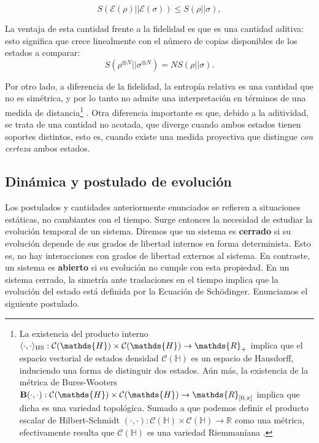 \documentclass{report} %
\newcommand{\lgg}{\langle}
\newcommand{\rgg}{\rangle}
\numberwithin{equation}{section}
\begin{document}
$$
S({\mathcal E}(\rho)||{\mathcal E}(\sigma))\leq S(\rho||\sigma),
$$

La ventaja de esta cantidad frente a la fidelidad es que es una cantidad aditiva: esto significa que crece linealmente con el número de copias disponibles de los estados a comparar: 
$$
S(\rho^{\otimes N}||\sigma^{\otimes N})=N S(\rho||\sigma).
$$

Por otro lado, a diferencia de la fidelidad, la entropía relativa es una cantidad que no es simétrica, y por lo tanto no admite una interpretación en términos de una medida de distancia\footnote{ La existencia del producto interno $\lgg\cdot,\cdot\rgg_{\textnormal{HS}}: \mathcal{C}(\mathds{H}) \times \mathcal{C}(\mathds{H}) \rightarrow  \mathds{R}_{+}$ implica que el espacio vectorial de estados densidad $\mathcal{C}(\mathds{H})$ es un espacio de Hausdorff, induciendo una forma de distinguir dos estados. Aún más, la existencia de la métrica de Bures-Wooters ${\bf B}(\cdot, \cdot): \mathcal{C}(\mathds{H}) \times \mathcal{C}(\mathds{H}) \rightarrow \mathds{R}_{[0, \pi]}$ implica que dicha es una variedad topológica. Sumado a que podemos definir el producto escalar de Hilbert-Schmidt $(\cdot, \cdot) : \mathcal{C}(\mathds{H}) \times \mathcal{C}(\mathds{H}) \rightarrow \mathds{R}$ como una métrica, efectivamente resulta que $\mathcal{C}(\mathds{H})$ es una variedad Riemmaniana \cite{NakaharaM, GoldbartStone, HoracioI, QITGeometry}. }
. Otra diferencia importante es que, debido a la aditividad, se trata de una cantidad no acotada, que diverge cuando ambos estados tienen soportes distintos, esto es, cuando existe una medida proyectiva que distingue  \emph{con certeza} ambos estados.
\subsection{Din\'amica y postulado de evoluci\'on}
 
Los postulados y cantidades anteriormente enunciados se refieren a situaciones estáticas, no cambiantes con el tiempo. Surge entonces la necesidad de estudiar la evolución temporal de un sistema. Diremos que un sistema es \textbf{cerrado} si su evolución depende de sus grados de libertad internos en forma determinista. Esto es, no hay interacciones con grados de libertad externos al sistema. En contraste, un sistema es \textbf{abierto} si su evolución no cumple con esta propiedad. En un sistema cerrado, la simetría ante traslaciones en el tiempo implica que la evolución del estado está definida por la Ecuación de Sch\"odinger\cite{HeinzPetruccione}\cite{Sch35}. Enunciamos el siguiente postulado. 
\end{document}
